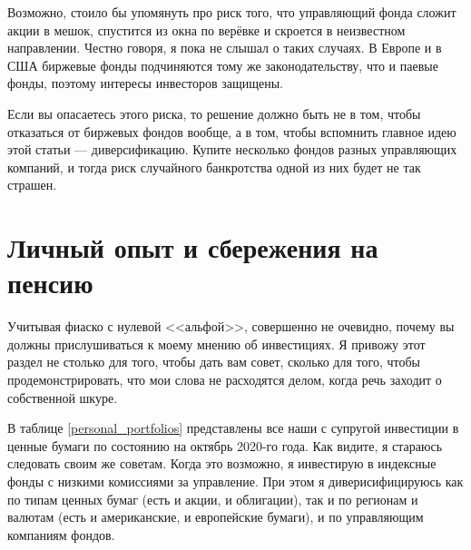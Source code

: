 Возможно, стоило бы упомянуть про риск того, что управляющий фонда сложит акции в мешок, спустится из окна по верёвке и скроется в неизвестном направлении. Честно говоря, я пока не слышал о таких случаях. В Европе и в США биржевые фонды подчиняются тому же законодательству, что и паевые фонды, поэтому интересы инвесторов защищены. 

Если вы опасаетесь этого риска, то решение должно быть не в том, чтобы отказаться от биржевых фондов вообще, а в том, чтобы вспомнить главное идею этой статьи --- диверсификацию. Купите несколько фондов разных управляющих компаний, и тогда риск случайного банкротства одной из них будет не так страшен.

\section{Личный опыт и сбережения на пенсию}

Учитывая фиаско с нулевой <<альфой>>, совершенно не очевидно, почему вы должны
прислушиваться к моему мнению об инвестициях. Я привожу этот раздел не столько
для того, чтобы дать вам совет, сколько для того, чтобы продемонстрировать, что
мои слова не расходятся делом, когда речь заходит о собственной шкуре.

В таблице \ref{personal_portfolios} представлены все наши с супругой инвестиции
в ценные бумаги по состоянию на октябрь 2020-го года. Как видите, я стараюсь
следовать своим же советам. Когда это возможно, я инвестирую в индексные фонды с
низкими комиссиями за управление. При этом я диверисифицируюсь как по типам
ценных бумаг (есть и акции, и облигации), так и по регионам и валютам (есть и американские, и европейские бумаги), и по управляющим компаниям фондов.

